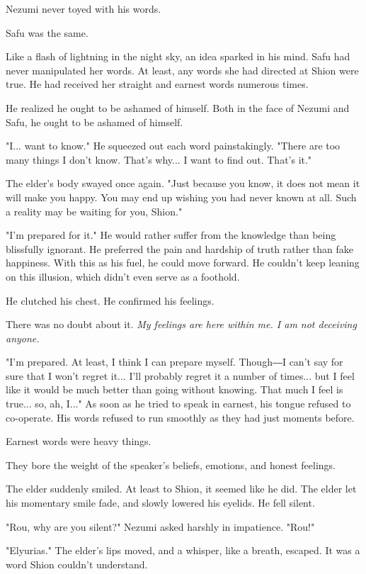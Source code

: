 Nezumi never toyed with his words.

Safu was the same.

Like a flash of lightning in the night sky, an idea sparked in his mind.
Safu had never manipulated her words. At least, any words she had
directed at Shion were true. He had received her straight and earnest
words numerous times.

He realized he ought to be ashamed of himself. Both in the face of
Nezumi and Safu, he ought to be ashamed of himself.

"I... want to know." He squeezed out each word painstakingly. "There are
too many things I don't know. That's why... I want to find out. That's
it."

The elder's body swayed once again. "Just because you know, it does not
mean it will make you happy. You may end up wishing you had never known
at all. Such a reality may be waiting for you, Shion."

"I'm prepared for it." He would rather suffer from the knowledge than
being blissfully ignorant. He preferred the pain and hardship of truth
rather than fake happiness. With this as his fuel, he could move
forward. He couldn't keep leaning on this illusion, which didn't even
serve as a foothold.

He clutched his chest. He confirmed his feelings.

There was no doubt about it. \emph{My feelings are here within me. I am not
deceiving anyone.}

"I'm prepared. At least, I think I can prepare myself. Though―I can't
say for sure that I won't regret it... I'll probably regret it a number
of times... but I feel like it would be much better than going without
knowing. That much I feel is true... so, ah, I..." As soon as he tried
to speak in earnest, his tongue refused to co-operate. His words refused
to run smoothly as they had just moments before.

Earnest words were heavy things.

They bore the weight of the speaker's beliefs, emotions, and honest
feelings.

The elder suddenly smiled. At least to Shion, it seemed like he did. The
elder let his momentary smile fade, and slowly lowered his eyelids. He
fell silent.

"Rou, why are you silent?" Nezumi asked harshly in impatience. "Rou!"

"Elyurias." The elder's lips moved, and a whisper, like a breath,
escaped. It was a word Shion couldn't understand.

